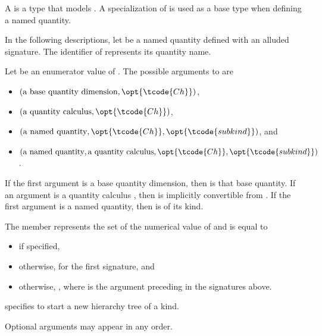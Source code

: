 \pnum
A  is a type that models .
A specialization of  is used as a base type when defining a named quantity.

\pnum
In the following descriptions, let  be a named quantity defined with an alluded signature.
The identifier of  represents its quantity name.

\pnum
Let  be an enumerator value of .
The possible arguments to  are
\begin{itemize}
\item
$(\text{a base quantity dimension}, \opt{\tcode{Ch}})$,
\item
$(\text{a quantity calculus}, \opt{\tcode{Ch}})$,
\item
$(\text{a named quantity}, \opt{\tcode{Ch}}, \opt{\tcode{subkind}})$, and
\item
$(\text{a named quantity}, \text{a quantity calculus}, \opt{\tcode{Ch}}, \opt{\tcode{subkind}})$.
\end{itemize}

\pnum
If the first argument is a base quantity dimension,
then  is that base quantity.
If an argument is a quantity calculus ,
then  is implicitly convertible from .
If the first argument is a named quantity,
then  is of its kind.

\pnum
The member  represents
the set of the numerical value of 
and is equal to
\begin{itemize}
\item
{} if specified,
\item
otherwise,  for the first signature, and
\item
otherwise, ,
where  is the argument preceding  in the signatures above.
\end{itemize}

\pnum
{} specifies  to start a new hierarchy tree of a kind.

\pnum
Optional arguments may appear in any order.

